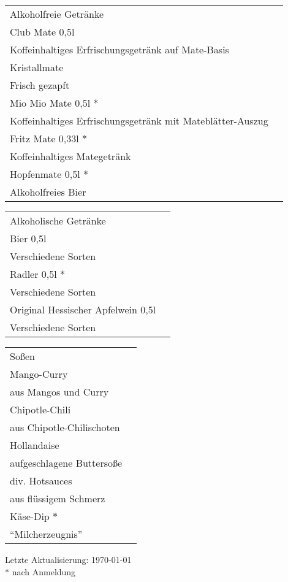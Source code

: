 \documentclass[12pt]{article}
\makeatletter
\newcommand*\ColText[1]{\textcolor{Goldenrod3}{#1}}
\newenvironment{Group}[1]
  {\noindent\begin{tabular*}{\textwidth}{@{}p{\linewidth}@{\extracolsep{\fill}}r@{}}
    {\fontsize{24}{29}\selectfont\ColText{#1}}\\[0.8em]}
  {\end{tabular*}}
\newcommand*\Entry[2]{%
  \sffamily#1 & #2}
\newcommand*\Expl[1]{%
  \hspace*{1em}\footnotesize #1\vspace*{5pt}}
\newcommand*\FooterTwo[0]{%
	\vfill
	\noindent \small Letzte Aktualisierung: \today\\
	$\ast$ nach Anmeldung}
\makeatother
\begin{document}
\begin{Group}{Alkoholfreie Getränke}
\Entry{Club Mate 0,5l}{} \\
\Expl{Koffeinhaltiges Erfrischungsgetränk auf Mate-Basis} \\
\Entry{Kristallmate}{} \\
\Expl{Frisch gezapft} \\
\Entry{Mio Mio Mate 0,5l $\ast$}{} \\
\Expl{Koffeinhaltiges Erfrischungsgetränk mit Mateblätter-Auszug} \\
\Entry{Fritz Mate 0,33l $\ast$}{} \\
\Expl{Koffeinhaltiges Mategetränk} \\
\Entry{Hopfenmate 0,5l $\ast$}{} \\
\Expl{Alkoholfreies Bier} \\
\end{Group}

\vspace{1em}

\begin{Group}{Alkoholische Getränke}
\Entry{Bier 0,5l}{} \\
\Expl{Verschiedene Sorten} \\
\Entry{Radler 0,5l $\ast$}{} \\
\Expl{Verschiedene Sorten} \\
\Entry{Original Hessischer Apfelwein 0,5l}{} \\
\Expl{Verschiedene Sorten} \\
\end{Group}

\vspace{1em}

\begin{Group}{Soßen}
	\Entry{Mango-Curry}{} \\
	\Expl{aus Mangos und Curry} \\
	\Entry{Chipotle-Chili}{} \\
	\Expl{aus Chipotle-Chilischoten} \\
	\Entry{Hollandaise} \\
	\Expl{aufgeschlagene Buttersoße} \\
	\Entry{div. Hotsauces}{} \\
	\Expl{aus flüssigem Schmerz} \\
	\Entry{Käse-Dip $\ast$} \\
	\Expl{``Milcherzeugnis''} \\
\end{Group}

\FooterTwo
\end{document}
